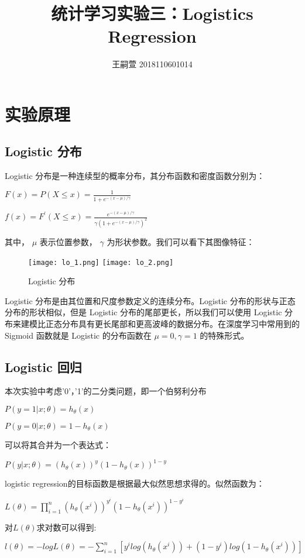 \documentclass[lang=cn,10pt,a4paper,cite=authoryear]{elegantpaper}
\title{统计学习实验三：Logistics Regression}
\author{王嗣萱 2018110601014}
\date{}
\begin{document}
\maketitle

\section{实验原理}

\subsection{Logistic 分布}
Logistic 分布是一种连续型的概率分布，其分布函数和密度函数分别为：

$F(x) = P(X \leq x)=\frac{1}{1+e^{-(x-\mu)/\gamma}} $

$ f(x) = F^{'}(X \leq x)=\frac{e^{-(x-\mu)/\gamma}}{\gamma(1+e^{-(x-\mu)/\gamma})^{2}}$

其中， $\mu$ 表示位置参数， $\gamma$ 为形状参数。我们可以看下其图像特征：

\begin{figure}[htbp]
	\centering
	\texttt{[image: lo\_1.png]}
	\texttt{[image: lo\_2.png]}
	\caption{Logistic 分布}
\end{figure}

Logistic 分布是由其位置和尺度参数定义的连续分布。Logistic 分布的形状与正态分布的形状相似，但是 Logistic 分布的尾部更长，所以我们可以使用 Logistic 分布来建模比正态分布具有更长尾部和更高波峰的数据分布。在深度学习中常用到的 Sigmoid 函数就是 Logistic 的分布函数在  $\mu=0, \gamma=1$ 的特殊形式。

\subsection{Logistic 回归}
本次实验中考虑'0'，'1'的二分类问题，即一个伯努利分布

$P(y=1|x;\theta)=h_{\theta}(x) $

$P(y=0|x;\theta)=1-h_{\theta}(x)$

可以将其合并为一个表达式：

$P(y|x;\theta)=(h_{\theta}(x))^{y}(1-h_{\theta}(x))^{1-y}$

logistic regression的目标函数是根据最大似然思想求得的。似然函数为：

$L(\theta)=\prod_{i=1}^{n}(h_{\theta}(x^{i}))^{y^{i}}(1-h_{\theta}(x^{i}))^{1-y^{i}}$

对$L(\theta)$求对数可以得到:

$l(\theta)=-logL(\theta)=-\sum_{i=1}^{n}[{y^{i}}log(h_{\theta}(x^{i}))+(1-y^{i})log(1-h_{\theta}(x^{i}))]$
\end{document}
